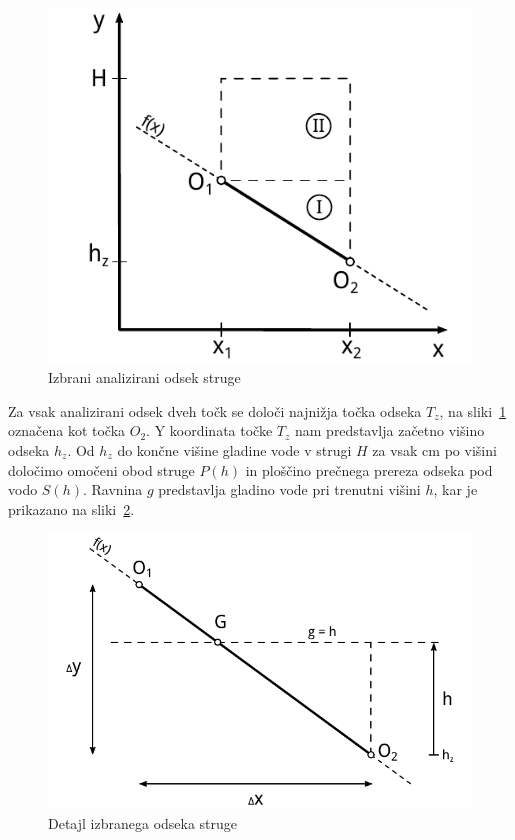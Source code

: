 \begin{figure}[H]
	\begin{centering}
		\includegraphics{slike/customChannel/odsek.pdf}\caption{Izbrani analizirani odsek struge} \label{fig:odsekStruge}
	\end{centering}
\end{figure}








Za vsak analizirani odsek dveh točk se določi najnižja točka odseka $T_z$, na sliki~\ref{fig:odsekStruge} označena kot točka $O_2$. Y koordinata točke $T_z$ nam predstavlja začetno višino odseka $h_{z}$. Od $h_z$ do končne višine gladine vode v strugi $H$ za vsak cm po višini določimo omočeni obod struge $P(h)$ in ploščino prečnega prereza odseka pod vodo $S(h)$.   Ravnina $g$ predstavlja gladino vode pri trenutni višini $h$, kar je prikazano na sliki~\ref{fig:custom_odsekDetajl}.


\begin{figure}[H]
	\begin{centering}
		\includegraphics{slike/customChannel/odsek_detajl.pdf}\caption{Detajl izbranega odseka struge}\label{fig:custom_odsekDetajl}
	\end{centering}
\end{figure}



